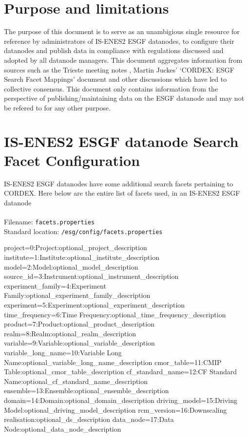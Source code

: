 \section{Purpose and limitations}
The purpose of this document is to serve as an unambigious single resource for reference by administrators of IS-ENES2 ESGF datanodes, to configure their datanodes and publish data in compliance with regulations discussed and adopted by all datanode managers. This document aggregates information from sources such as the Trieste meeting notes \cite{trieste}, Martin Juckes' `CORDEX: ESGF Search Facet Mappings' document \cite{cordexfacetsdoc} and other discussions which have led to collective consensus. This document only contains information from the perspective of publishing/maintaining data on the ESGF datanode and may not be refered to for any other purpose.

\section{IS-ENES2 ESGF datanode Search Facet Configuration}
IS-ENES2 ESGF datanodes have some additional search facets pertaining to CORDEX. Here below are the entire list of facets used, in an IS-ENES2 ESGF datanode\\
\vspace{1mm}\\
Filename: \texttt{facets.properties}\\
Standard location: \texttt{/esg/config/facets.properties}
\begin{verbatimtab}[4]
project=0:Project:optional_project_description
institute=1:Institute:optional_institute_description
model=2:Model:optional_model_description
source_id=3:Instrument:optional_instrument_description
experiment_family=4:Experiment Family:optional_experiment_family_description
experiment=5:Experiment:optional_experiment_description
time_frequency=6:Time Frequency:optional_time_frequency_description
product=7:Product:optional_product_description
realm=8:Realm:optional_realm_description
variable=9:Variable:optional_variable_description
variable_long_name=10:Variable Long Name:optional_variable_long_name_description
cmor_table=11:CMIP Table:optional_cmor_table_description
cf_standard_name=12:CF Standard Name:optional_cf_standard_name_description
ensemble=13:Ensemble:optional_ensemble_description
domain=14:Domain:optional_domain_description
driving_model=15:Driving Model:optional_driving_model_description
rcm_version=16:Downscaling realisation:optional_ds_description
data_node=17:Data Node:optional_data_node_description
\end{verbatimtab}

